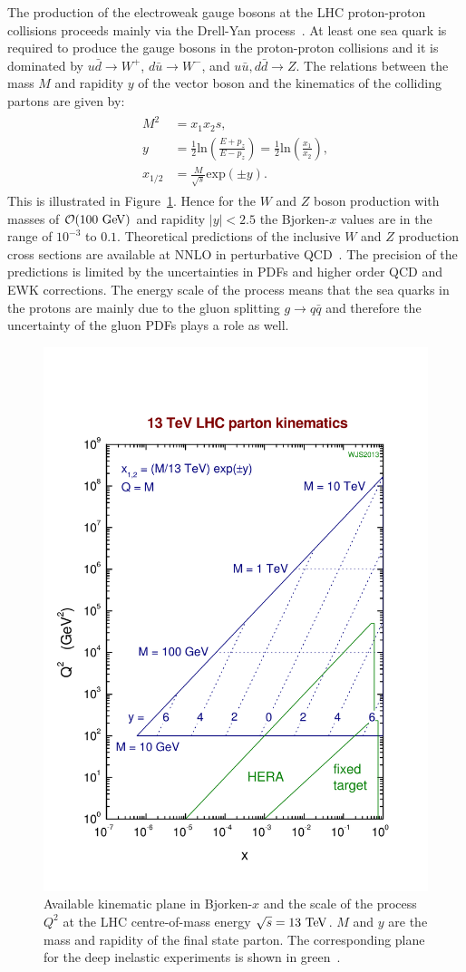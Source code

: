 The production of the electroweak gauge bosons at the LHC proton-proton collisions proceeds mainly via the Drell-Yan process~\cite{Drell:1970wh}. At least one sea quark is required to produce the gauge bosons in the proton-proton collisions and it is dominated by $u\bar{d} \rightarrow W^{+}$, $d\bar{u} \rightarrow W^{-}$, and $u\bar{u},d\bar{d} \rightarrow Z$. The relations between the mass $M$ and rapidity $y$ of the vector boson and the kinematics of the colliding partons are given by:
\begin{eqnarray} \label{eq:kinematics}
\begin{aligned}
M^2 &= x_{1}x_{2}s, \\
y &= \frac{1}{2} \mathrm{ln}\left(\frac{E+p_{z}}{E-p_{z}}\right) = \frac{1}{2}\mathrm{ln}\left(\frac{x_1}{x_2}\right), \\
x_{1/2} &= \frac{M}{\sqrt{s}} \mathrm{exp}(\pm y).
\end{aligned}
\end{eqnarray}   
This is illustrated in Figure~\ref{fig:lhc_grid}. Hence for the $W$ and $Z$ boson production with masses of $\mathcal{O} (100~\mathrm{Ge\kern -0.1em V})$ and rapidity $|y|<2.5$ the Bjorken-$x$ values are in the range of $10^{-3}$ to $0.1$. Theoretical predictions of the inclusive $W$ and $Z$ production cross sections are available at NNLO in perturbative QCD~\cite{Rijken:1994sh,Hamberg:1990np,vanNeerven:1991gh,Harlander:2002wh,PhysRevD.69.094008}. The precision of the predictions is limited by the uncertainties in PDFs and higher order QCD and EWK corrections. The energy scale of the process means that the sea quarks in the protons are mainly due to the gluon splitting $g \rightarrow q\bar{q}$ and therefore the uncertainty of the gluon PDFs plays a role as well.

\begin{figure}[h]
\centering
\includegraphics[width=0.49\columnwidth]{figures_chapter2/lhcgrid13}
\caption{Available kinematic plane in Bjorken-$x$ and the scale of the process $Q^2$ at the LHC centre-of-mass energy $\sqrt{s}=13~\mathrm{Te\kern -0.1em V}$. $M$ and $y$ are the mass and rapidity of the final state parton. The corresponding plane for the deep inelastic experiments is shown in green~\cite{sterling}. }
\label{fig:lhc_grid}
\end{figure} 

